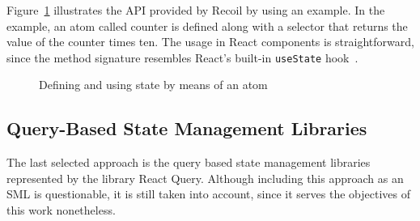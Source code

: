 Figure~\ref{code_recoil_atom_example} illustrates the API provided by Recoil by using an example.
In the example, an atom called counter is defined along with a selector
that returns the value of the counter times ten. The usage in React
components is straightforward, since the method signature resembles
React's built-in \texttt{useState} hook~\cite{react_using_the_state_hook}.

\begin{figure}
\begin{Shaded}
\begin{Highlighting}[]
\OperatorTok{=} \NormalTok{(\{}
  \OperatorTok{:} \OperatorTok{,} 
  \OperatorTok{:} \OperatorTok{,} 
\NormalTok{\})}\OperatorTok{;}

\OperatorTok{=} \NormalTok{(\{}
  \OperatorTok{:} \OperatorTok{,}
  \OperatorTok{:}\KeywordTok{=\textgreater{}}  \OperatorTok{*} 
\NormalTok{\})}\OperatorTok{;}

\NormalTok{ [count}\OperatorTok{,}\NormalTok{ setCount] }\OperatorTok{=} \OperatorTok{;}
\end{Highlighting}
\end{Shaded}
\caption{Defining and using state by means of an atom}
\label{code_recoil_atom_example}
\end{figure}

\clearpage
\clearpage
\hypertarget{query-based-state-management-libraries}{%
\subsection{Query-Based State Management
Libraries}\label{query-based-state-management-libraries}}

The last selected approach is the query based state management libraries
represented by the library React Query\cite{react_query}. Although including this approach
as an SML is questionable, it is still taken into account, since it
serves the objectives of this work nonetheless.

